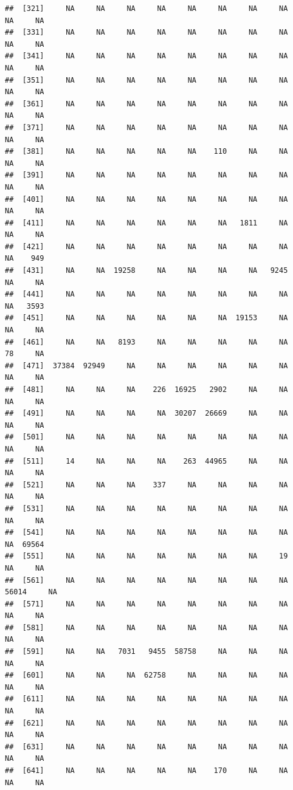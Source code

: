 \documentclass[11pt,a4paper,]{article}
\begin{document}
\begin{verbatim}
##  [321]     NA     NA     NA     NA     NA     NA     NA     NA     NA     NA
##  [331]     NA     NA     NA     NA     NA     NA     NA     NA     NA     NA
##  [341]     NA     NA     NA     NA     NA     NA     NA     NA     NA     NA
##  [351]     NA     NA     NA     NA     NA     NA     NA     NA     NA     NA
##  [361]     NA     NA     NA     NA     NA     NA     NA     NA     NA     NA
##  [371]     NA     NA     NA     NA     NA     NA     NA     NA     NA     NA
##  [381]     NA     NA     NA     NA     NA    110     NA     NA     NA     NA
##  [391]     NA     NA     NA     NA     NA     NA     NA     NA     NA     NA
##  [401]     NA     NA     NA     NA     NA     NA     NA     NA     NA     NA
##  [411]     NA     NA     NA     NA     NA     NA   1811     NA     NA     NA
##  [421]     NA     NA     NA     NA     NA     NA     NA     NA     NA    949
##  [431]     NA     NA  19258     NA     NA     NA     NA   9245     NA     NA
##  [441]     NA     NA     NA     NA     NA     NA     NA     NA     NA   3593
##  [451]     NA     NA     NA     NA     NA     NA  19153     NA     NA     NA
##  [461]     NA     NA   8193     NA     NA     NA     NA     NA     78     NA
##  [471]  37384  92949     NA     NA     NA     NA     NA     NA     NA     NA
##  [481]     NA     NA     NA    226  16925   2902     NA     NA     NA     NA
##  [491]     NA     NA     NA     NA  30207  26669     NA     NA     NA     NA
##  [501]     NA     NA     NA     NA     NA     NA     NA     NA     NA     NA
##  [511]     14     NA     NA     NA    263  44965     NA     NA     NA     NA
##  [521]     NA     NA     NA    337     NA     NA     NA     NA     NA     NA
##  [531]     NA     NA     NA     NA     NA     NA     NA     NA     NA     NA
##  [541]     NA     NA     NA     NA     NA     NA     NA     NA     NA  69564
##  [551]     NA     NA     NA     NA     NA     NA     NA     19     NA     NA
##  [561]     NA     NA     NA     NA     NA     NA     NA     NA  56014     NA
##  [571]     NA     NA     NA     NA     NA     NA     NA     NA     NA     NA
##  [581]     NA     NA     NA     NA     NA     NA     NA     NA     NA     NA
##  [591]     NA     NA   7031   9455  58758     NA     NA     NA     NA     NA
##  [601]     NA     NA     NA  62758     NA     NA     NA     NA     NA     NA
##  [611]     NA     NA     NA     NA     NA     NA     NA     NA     NA     NA
##  [621]     NA     NA     NA     NA     NA     NA     NA     NA     NA     NA
##  [631]     NA     NA     NA     NA     NA     NA     NA     NA     NA     NA
##  [641]     NA     NA     NA     NA     NA    170     NA     NA     NA     NA

\end{verbatim}
\end{document}

